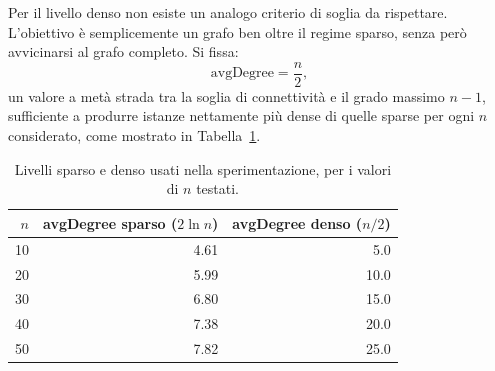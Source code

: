 Per il livello denso non esiste un analogo criterio di soglia da rispettare. 
L'obiettivo è semplicemente un grafo ben oltre il regime sparso, senza però avvicinarsi al grafo completo. Si fissa:
\begin{equation}
    \text{avgDegree} = \frac{n}{2},
\end{equation}
un valore a metà strada tra la soglia di connettività e il grado massimo $n-1$, sufficiente a produrre istanze nettamente più dense di quelle sparse per ogni $n$ considerato, come mostrato in Tabella~\ref{tab:sparse-dense-levels}.

\begin{table}[tbp]
    \centering
    \begin{tabular}{@{}rrr@{}}
        \toprule
        $n$ & avgDegree sparso ($2\ln n$) & avgDegree denso ($n/2$) \\
        \midrule
        10 & 4.61 & 5.0 \\
        20 & 5.99 & 10.0 \\
        30 & 6.80 & 15.0 \\
        40 & 7.38 & 20.0 \\
        50 & 7.82 & 25.0 \\
        \bottomrule
    \end{tabular}
    \caption{Livelli sparso e denso usati nella sperimentazione, per i valori di $n$ testati.}
    \label{tab:sparse-dense-levels}
\end{table}

